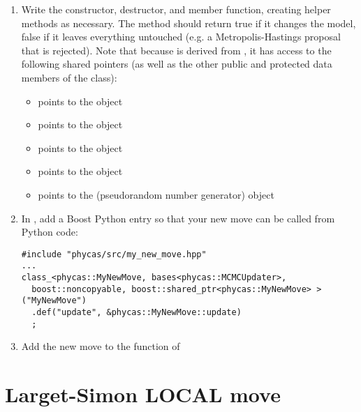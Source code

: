 \begin{enumerate}
\begin{verbatim}
\end{verbatim}
\item Write the constructor, destructor, and  member function, creating helper methods as necessary. The  method should return true if it changes the model, false if it leaves everything untouched (e.g. a Metropolis-Hastings proposal that is rejected). Note that because  is derived from , it has access to the following shared pointers (as well as the other public and protected data members of the  class):
\begin{itemize}
\item {} points to the  object
\item {} points to the  object
\item {} points to the  object
\item {} points to the  object
\item {} points to the  (pseudorandom number generator) object
\end{itemize}
\item In , add a Boost Python entry so that your new move can be called from Python code:
\begin{verbatim}
#include "phycas/src/my_new_move.hpp"
...
class_<phycas::MyNewMove, bases<phycas::MCMCUpdater>, 
  boost::noncopyable, boost::shared_ptr<phycas::MyNewMove> >("MyNewMove") 
  .def("update", &phycas::MyNewMove::update)
  ;
\end{verbatim}
\item Add the new move to the  function of 
\end{enumerate}

\section{Larget-Simon LOCAL move}

%
%

